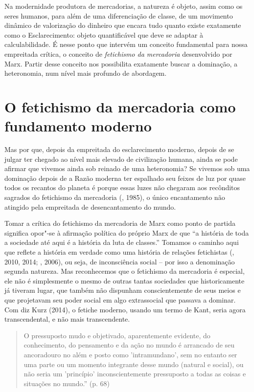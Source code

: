 Na modernidade produtora de mercadorias, a natureza é objeto, assim como
os seres humanos, para além de uma diferenciação de classe, de um
movimento dinâmico de valorização do dinheiro que encara tudo quanto
existe exatamente como o Esclarecimento: objeto quantificável que deve
se adaptar à calculabilidade. É nesse ponto que intervém um conceito
fundamental para nossa empreitada crítica, o conceito de
\emph{fetichismo da mercadoria} desenvolvido por Marx. Partir desse
conceito nos possibilita exatamente buscar a dominação, a heteronomia,
num nível mais profundo de abordagem.

\section*{O fetichismo da mercadoria como fundamento moderno}

Mas por que, depois da empreitada do esclarecimento moderno, depois de
se julgar ter chegado ao nível mais elevado de civilização humana, ainda
se pode afirmar que vivemos ainda sob reinado de uma heteronomia? Se
vivemos sob uma dominação depois de a Razão moderna ter espalhado seu
feixes de luz por quase todos os recantos do planeta é porque essas
luzes não chegaram aos recônditos sagrados do fetichismo da mercadoria
(, 1985), o único encantamento não atingido pela empreitada de
desencantamento do mundo.

Tomar a crítica do fetichismo da mercadoria de Marx como ponto de
partida significa opor"-se à afirmação política do próprio Marx de que
``a história de toda a sociedade até aqui é a história da luta de
classes.'' Tomamos o caminho aqui que reflete a história em verdade como
uma história de relações fetichistas (, 2010, 2014; , 2006), ou
seja, de inconsciência social -- por isso a denominação segunda
natureza. Mas reconhecemos que o fetichismo da mercadoria é especial,
ele não é simplesmente o mesmo de outras tantas sociedades que
historicamente já tiveram lugar, que também não dispunham
conscientemente de seus meios e que projetavam seu poder social em algo
extrassocial que passava a dominar. Com diz Kurz (2014), o fetiche
moderno, usando um termo de Kant, seria agora transcendental, e não mais
transcendente.

\begin{quote}
O pressuposto mudo e objetivado, aparentemente evidente, do
conhecimento, do pensamento e da ação no mundo é arrancado de seu
ancoradouro no além e posto como 'intramundano', sem no entanto ser uma
parte ou um momento integrante desse mundo (natural e social), ou não
seria um 'princípio' inconscientemente pressuposto a todas as coisas e
situações no mundo.'' (p. 68)
\end{quote}

